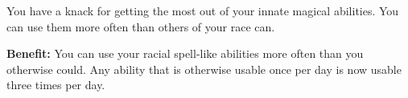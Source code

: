 
You have a knack for getting the most out of your innate magical abilities. You can use them more often than others of your race can.

\textbf{Benefit:} You can use your racial spell-like abilities more often than you otherwise could. Any ability that is otherwise usable once per day is now usable three times per day.